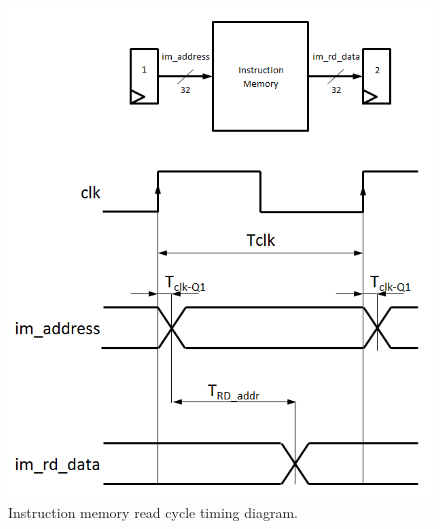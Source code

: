\begin{figure}
\begin{center}
\includegraphics[scale=0.55]{./figures/im_rd_timing.png}
\end{center}
\caption{Instruction memory read cycle timing diagram.}
\label{fig:im_rd_timing}
\end{figure}

